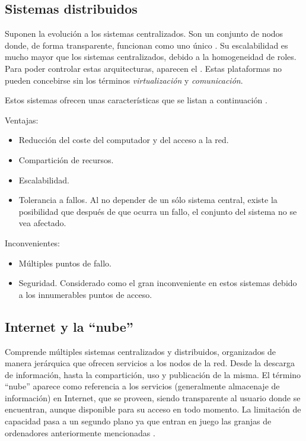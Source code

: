 \subsection{Sistemas distribuidos }
Suponen la evolución a los sistemas centralizados. Son un conjunto de 
nodos donde, de forma transparente, funcionan como uno único 
\cite{Tanenbaum}. Su escalabilidad es mucho mayor que los sistemas 
centralizados, debido a la homogeneidad de roles. Para poder controlar 
estas arquitecturas, aparecen el . Estas 
plataformas no pueden concebirse sin los términos 
\emph{virtualización} y \emph{comunicación}.

Estos sistemas ofrecen unas características que se listan a 
continuación \cite{DAD}.

Ventajas:
\begin{itemize}
	\item Reducción del coste del computador y del acceso a la red.
	\item Compartición de recursos.
	\item Escalabilidad.
	\item Tolerancia a fallos. Al no depender de un sólo sistema 
	central, existe la posibilidad que después de que ocurra un fallo, 
	el conjunto del sistema no se vea afectado.
\end{itemize}

Inconvenientes:
\begin{itemize}
	\item Múltiples puntos de fallo.
	\item Seguridad. Considerado como el gran inconveniente en estos 
	sistemas debido a los innumerables puntos de acceso.
\end{itemize}

\subsection{Internet y la ``nube''}
Comprende múltiples sistemas centralizados y distribuidos, organizados 
de manera jerárquica que ofrecen servicios a los nodos de la red. Desde la 
descarga de información, hasta la compartición, uso y publicación de 
la misma. El término ``nube''  
aparece como referencia a los servicios 
(generalmente almacenaje de información) en Internet, que se proveen, 
siendo transparente al usuario donde se encuentran, aunque 
disponible para su acceso en todo momento. La limitación de capacidad 
pasa a un segundo plano ya que entran en juego las granjas de 
ordenadores anteriormente mencionadas \cite{CloudComputing}.

